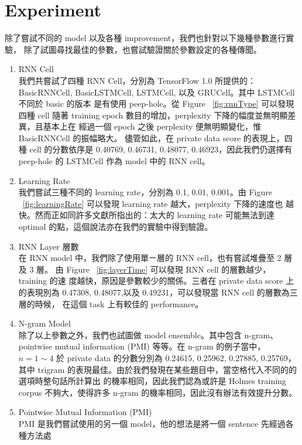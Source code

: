 \documentclass[12pt, a4paper]{article}
\theoremstyle{mystyle}	%
\begin{document}
\section{Experiment}
除了嘗試不同的 model 以及各種 improvement，我們也針對以下幾種參數進行實驗，
除了試圖尋找最佳的參數，也嘗試驗證關於參數設定的各種傳聞。
\begin{enumerate}
  \item RNN Cell\\
    我們共嘗試了四種 RNN Cell，分別為 TensorFlow 1.0 所提供的：BasicRNNCell, 
    BasicLSTMCell, LSTMCell, 以及 GRUCell。其中 LSTMCell 不同於 basic 的版本
    是有使用 peep-hole。從 Figure ~\ref{fig:rnnType} 可以發現四種 cell 隨著 
    training epoch 數目的增加，perplexity 下降的幅度並無明顯差異，且基本上在
    經過一個 epoch 之後 perplexity 便無明顯變化，惟 BasicRNNCell 的振幅略大。
    儘管如此，在 private data score 的表現上，四種 cell 的分數依序是 
    0.40769, 0.46731, 0.48077, 0.46923，因此我們仍選擇有 peep-hole 的 
    LSTMCell 作為 model 中的 RNN cell。
  \item Learning Rate\\
    我們嘗試三種不同的 learning rate，分別為 0.1, 0.01, 0.001。由 Figure 
    ~\ref{fig:learningRate} 可以發現 learning rate 越大，perplexity 下降的速度也
    越快。然而正如同許多文獻所指出的：太大的 learning rate 可能無法到達 optimal 
    的點，這個說法亦在我們的實驗中得到驗證。
  \item RNN Layer 層數\\
    在 RNN model 中，我們除了使用單ㄧ層的 RNN cell，也有嘗試堆疊至 2 層及 3 層。
    由 Figure ~\ref{fig:layerTime} 可以發現 RNN cell 的層數越少， training 的速
    度越快，原因是參數較少的關係。三者在 private data score 上的表現別為
    0.47308, 0.48077,以及 0.49231，可以發現當 RNN cell 的層數為三層的時候，
    在這個 task 上有較佳的 performance。
  \item N-gram Model\\
    除了以上參數之外，我們也試圖做 model ensemble。其中包含 n-gram、pointwise
    mutual information (PMI) 等等。在 n-gram 的例子當中，$n = 1 \sim 4$ 於
    private data 的分數分別為 0.24615, 0.25962, 0.27885, 0.25769，其中 trigram 
    的表現最佳。由於我們發現在某些題目中，當空格代入不同的的選項時整句話所計算出
    的機率相同，因此我們認為或許是 Holmes training corpus 不夠大，使得許多 
    n-gram 的機率相同，因此沒有辦法有效提升分數。
  \item Pointwise Mutual Information (PMI)\\
    PMI 是我們嘗試使用的另一個 model，他的想法是將一個 sentence 先經過各種方法處

\end{enumerate}
\end{document}
